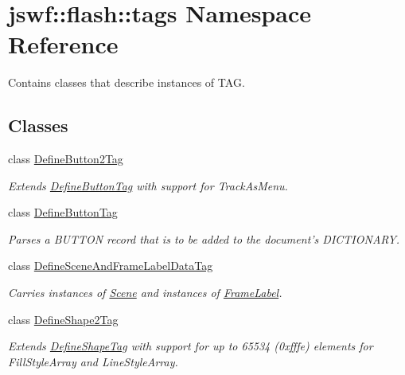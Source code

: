 \hypertarget{namespacejswf_1_1flash_1_1tags}{\section{jswf\+:\+:flash\+:\+:tags Namespace Reference}
\label{namespacejswf_1_1flash_1_1tags}
}


Contains classes that describe instances of {\ttfamily T\+A\+G}.  


\subsection*{Classes}
\begin{DoxyCompactItemize}
\item 
class \hyperlink{classjswf_1_1flash_1_1tags_1_1_define_button2_tag}{Define\+Button2\+Tag}
\begin{DoxyCompactList}\small\item\em Extends \hyperlink{classjswf_1_1flash_1_1tags_1_1_define_button_tag}{Define\+Button\+Tag} with support for {\ttfamily Track\+As\+Menu}. \end{DoxyCompactList}\item 
class \hyperlink{classjswf_1_1flash_1_1tags_1_1_define_button_tag}{Define\+Button\+Tag}
\begin{DoxyCompactList}\small\item\em Parses a {\ttfamily B\+U\+T\+T\+O\+N} record that is to be added to the document's {\ttfamily D\+I\+C\+T\+I\+O\+N\+A\+R\+Y}. \end{DoxyCompactList}\item 
class \hyperlink{classjswf_1_1flash_1_1tags_1_1_define_scene_and_frame_label_data_tag}{Define\+Scene\+And\+Frame\+Label\+Data\+Tag}
\begin{DoxyCompactList}\small\item\em Carries instances of \hyperlink{structjswf_1_1flash_1_1_scene}{Scene} and instances of \hyperlink{structjswf_1_1flash_1_1_frame_label}{Frame\+Label}. \end{DoxyCompactList}\item 
class \hyperlink{classjswf_1_1flash_1_1tags_1_1_define_shape2_tag}{Define\+Shape2\+Tag}
\begin{DoxyCompactList}\small\item\em Extends \hyperlink{classjswf_1_1flash_1_1tags_1_1_define_shape_tag}{Define\+Shape\+Tag} with support for up to 65534 (0xfffe) elements for {\ttfamily Fill\+Style\+Array} and {\ttfamily Line\+Style\+Array}. \end{DoxyCompactList}\item 

\end{DoxyCompactItemize}
